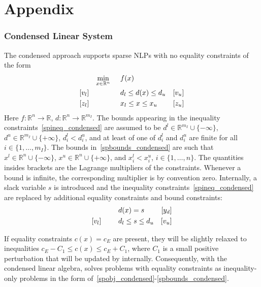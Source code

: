 \clearpage
\appendix
\section{Appendix}

\subsubsection{Condensed Linear System}\label{kkt:condensed}

The condensed approach supports sparse NLPs with no equality constraints of the form
\begin{align}
&&&&\min_{x\in\mathbb{R}^n} & \hspace{0.5cm} f(x) &&&& \label{spobj_condensed}\\
&&[v_l]&&& \hspace{0.5cm} d_l \leq d(x) \leq d_u  &[v_u]&&&\label{spineq_condensed} \\
&&[z_l]&&& \hspace{0.5cm} x_l \leq x \leq x_u & [z_u] &&&\label{spbounds_condensed}
\end{align}
Here $f:\mathbb{R}^n\rightarrow\mathbb{R}$, $d:\mathbb{R}^n\rightarrow\mathbb{R}^{m_I}$. The bounds appearing in the inequality constraints~\eqref{spineq_condensed} are assumed to be $d^l\in\mathbb{R}^{m_I}\cup\{-\infty\}$, $d^u\in\mathbb{R}^{m_I}\cup\{+\infty\}$, $d_i^l < d_i^u$, and at least of one of $d_i^l$ and $d_i^u$ are finite for all $i\in\{1,\ldots,m_I\}$. The bounds in~\eqref{spbounds_condensed} are such that $x^l\in\mathbb{R}^{n}\cup\{-\infty\}$, $x^u\in\mathbb{R}^{n}\cup\{+\infty\}$, and $x_i^l < x_i^u$, $i\in\{1,\ldots,n\}$. The quantities insides brackets are the Lagrange multipliers of the constraints. Whenever a bound is infinite, the corresponding multiplier is by convention zero.
Internally, a slack variable $s$ is introduced and the inequality constraints~\eqref{spineq_condensed} are replaced by additional equality constraints and bound constraints:
\begin{align}
&&&&& \hspace{0.5cm} d(x) = s &[y_d]&&& \\
&&[v_l]&&& \hspace{0.5cm} d_l \leq s \leq d_u  &[v_u]&&&\label{spineq_s} 
\end{align}

 If equality constraints $c(x)=c_E$ are present, they will be slightly relaxed to inequalities $c_E - C_1\leq c(x)\leq c_E+C_1$, where $C_1$ is a small positive perturbation that will be updated by \Hi internally. Consequently, with the condensed linear algebra, \Hi solves problems with equality constraints as inequality-only problems in the form of~\eqref{spobj_condensed}-\eqref{spbounds_condensed}.\\

